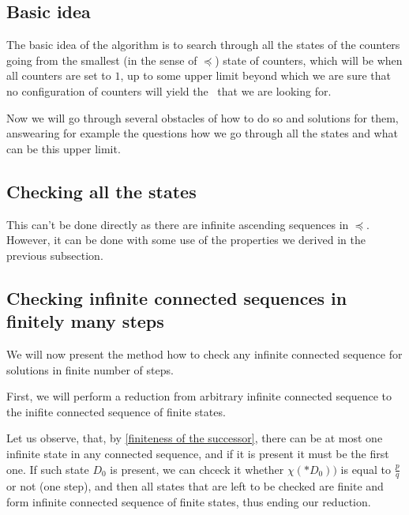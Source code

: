 \subsection{Basic idea}\label{basic idea}
The basic idea of the algorithm is to search through all the states of the counters going 
from the smallest (in the sense of $\preceq$) state of counters, which will be when all counters 
are set to $1$, up to some upper limit beyond which we are sure that no configuration of 
counters will yield the \Eoc\ that we are looking for. 

Now we will go through several obstacles of how to do so and solutions for them, answearing for 
example the 
questions how we go through all the states and what can be this upper limit. 


\subsection{Checking all the states}
This can't be done directly as there are infinite ascending sequences in $\preceq$. 
However, it can be done with some use of the properties we derived in the previous subsection.
\subsection{Checking infinite connected sequences in finitely many steps}
\label{searching idea connected}
We will now present the method how to check any infinite connected sequence for solutions 
in finite number of steps.


First, we will perform a reduction from 
arbitrary infinite connected sequence to the inifite connected sequence of finite states. 

Let us observe, that, by \ref{finiteness of the successor}, 
there can be at most one infinite state in 
any connected sequence, and if it is present it must be the first one. If such state 
$D_0$ is present, 
we can chceck it whether $\chi(*D_0))$ is equal to $\frac{p}{q}$ or not (one step), 
and then all states that are left to be checked are finite and form infinite 
connected sequence of finite states, thus ending our reduction. 

